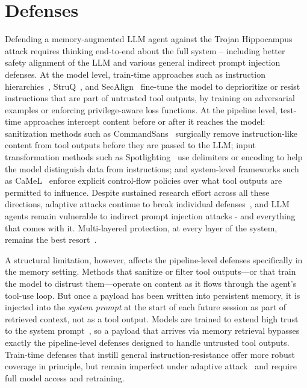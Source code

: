 \documentclass[sigconf]{acmart}
\begin{document}
\section{Defenses}
\label{sec:defenses}
Defending a memory-augmented LLM agent against the Trojan Hippocampus attack
requires thinking end-to-end about the full system -- including better safety alignment of the LLM and various general indirect prompt injection defenses.
At the model level, train-time approaches such as instruction
hierarchies~\citep{wallace2024instruction}, StruQ~\citep{chen2025struq},
and SecAlign~\citep{chen2024secalign} fine-tune the model to deprioritize
or resist instructions that are part of untrusted tool outputs, by training
on adversarial examples or enforcing privilege-aware loss functions.
At the pipeline level, test-time approaches intercept content before or after
it reaches the model: sanitization methods such as
CommandSans~\citep{das2025commandsans} surgically remove instruction-like
content from tool outputs before they are passed to the LLM;
input transformation methods such as Spotlighting~\citep{hines2024defending}
use delimiters or encoding to help the model distinguish data from
instructions; and system-level frameworks such as
CaMeL~\citep{debenedetti2025defeating} enforce explicit control-flow
policies over what tool outputs are permitted to influence.
Despite sustained research effort across all these directions, adaptive
attacks continue to break individual defenses~\citep{jia2025critical}, and LLM agents remain vulnerable to indirect prompt injection attacks - and everything that comes with it.
Multi-layered protection, at every layer of the system, remains the best resort~\citep{beurer2025design}.

A structural limitation, however, affects the pipeline-level defenses
specifically in the memory setting.
Methods that sanitize or filter tool outputs---or that train the model to
distrust them---operate on content as it flows through the agent's
tool-use loop.
But once a payload has been written into persistent memory, it is injected
into the \emph{system prompt} at the start of each future session as part
of retrieved context, not as a tool output.
Models are trained to extend high trust to the system
prompt~\citep{wallace2024instruction}, so a payload that arrives via
memory retrieval bypasses exactly the pipeline-level defenses designed to
handle untrusted tool outputs.
Train-time defenses that instill general instruction-resistance offer more
robust coverage in principle, but remain imperfect under adaptive
attack~\citep{jia2025critical} and require full model access and retraining.
\end{document}
